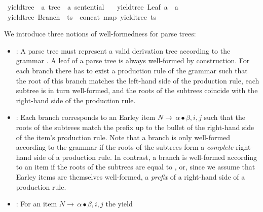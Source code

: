 \begin{isabellebody}
\isanewline
{}\isamarkupfalse%
\ yield{\isacharunderscore}{\kern0pt}tree\ {\isacharcolon}{\kern0pt}{\isacharcolon}{\kern0pt}\ {\isachardoublequoteopen}{\isacharprime}{\kern0pt}a\ tree\ {\isasymRightarrow}\ {\isacharprime}{\kern0pt}a\ sentential{\isachardoublequoteclose}\ \isanewline
\ \ {\isachardoublequoteopen}yield{\isacharunderscore}{\kern0pt}tree\ {\isacharparenleft}{\kern0pt}Leaf\ a{\isacharparenright}{\kern0pt}\ {\isacharequal}{\kern0pt}\ {\isacharbrackleft}{\kern0pt}a{\isacharbrackright}{\kern0pt}{\isachardoublequoteclose}\isanewline
{\isacharbar}{\kern0pt}\ {\isachardoublequoteopen}yield{\isacharunderscore}{\kern0pt}tree\ {\isacharparenleft}{\kern0pt}Branch\ {\isacharunderscore}{\kern0pt}\ ts{\isacharparenright}{\kern0pt}\ {\isacharequal}{\kern0pt}\ concat\ {\isacharparenleft}{\kern0pt}map\ yield{\isacharunderscore}{\kern0pt}tree\ ts{\isacharparenright}{\kern0pt}{\isachardoublequoteclose}%
\begin{isamarkuptext}%
We introduce three notions of well-formedness for parse trees:
\begin{itemize}
  \item {}: A parse tree must represent a valid derivation tree according to the grammar \isa{{\isasymG}}.
    A leaf of a parse tree is always well-formed by construction. For each branch there has to exist a production rule of the grammar \isa{{\isasymG}}
    such that the root of this branch matches the left-hand side of the production rule, each subtree is in turn well-formed, and
    the roots of the subtrees coincide with the right-hand side of the production rule.
  \item {}: Each branch corresponds to an Earley item
    $N \rightarrow \, \alpha \bullet \beta, i, j$ such that the roots of the subtrees match
    the prefix \isa{{\isasymalpha}} up to the bullet of the right-hand side of the item's production rule. Note that a branch is only well-formed according to the grammar \isa{{\isasymG}} if
    the roots of the subtrees form a \textit{complete} right-hand side of a production rule.
    In contrast, a branch is well-formed according to an item if the roots of the subtrees are equal
    to \isa{{\isasymalpha}}, or, since we assume that Earley items are themselves well-formed, a \textit{prefix}
    of a right-hand side of a production rule.
  \item {}: For an item $N \rightarrow \, \alpha \bullet \beta, i, j$ the yield

\end{itemize}
\end{isamarkuptext}
\end{isabellebody}

